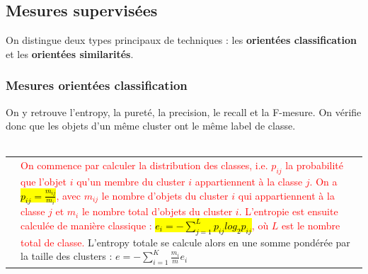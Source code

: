 \documentclass[letterpaper, 12pt]{article}
\newcommand{\alinea}{
\hspace*{0.5cm}}
\newcommand{\red}[1]{
	\textcolor{red}{#1}}
\newcommand{\myul}[1]{
		\underline{\smash{#1}}
	}
\begin{document}
		\subsection{Mesures supervisées}
			\alinea On distingue deux types principaux de techniques :
				les \textbf{orientées classification} et les 
				\textbf{orientées similarités}.
			\subsubsection{Mesures orientées classification}
				\alinea On y retrouve l'entropy, la pureté, la precision,
					le recall et la F-mesure. On vérifie donc que 
					les objets d'un même cluster ont le même label de
					classe.\\~\\
				\begin{tabular}{lp{15.25cm}}
					\myul{\textbf{\hl{Entropy}}} & 
						\red{On commence par calculer la distribution
							 des classes, i.e. $p_{ij}$ la probabilité
							 que l'objet $i$ qu'un membre du cluster $i$
							 appartiennent à la classe $j$. On a 
							 \hl{$p_{ij} = \frac{m_{ij}}{m_i}$}, 
							 avec $m_{ij}$
							 le nombre d'objets du cluster $i$ qui
							 appartiennent à la classe $j$ et $m_i$ le
							 nombre total d'objets du cluster $i$.
							 L'entropie est ensuite calculée de manière
							 classique : 
							 \hl{$e_i = -\sum_{j=1}^{L} p_{ij} log_2 p_{ij}$},
							 où $L$ est le nombre total de classe.} L'entropy
							 totale se calcule alors en une somme pondérée
							 par la taille des clusters :
							 $e = -\sum_{i=1}^{K} \frac{m_i}{m} e_{i}$
				\end{tabular}
			\newpage
\end{document}
